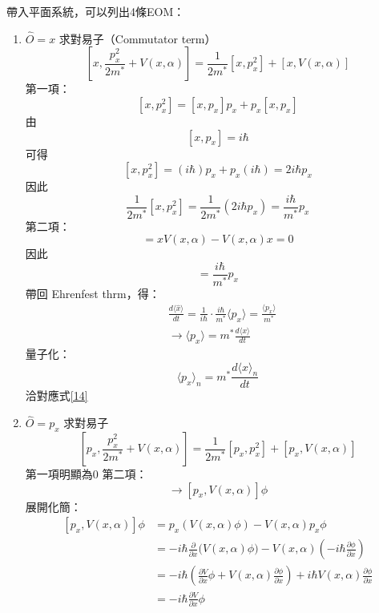 \documentclass[12pt]{article}
\begin{document}
帶入平面系統，可以列出4條EOM：
\begin{enumerate}
    \item $\hat{O}=x$
\newline\noindent
求對易子（Commutator term）
\begin{equation*}
    \left[x,\frac{p_x^2}{2m^*}+V(x,\alpha)\right]=\frac{1}{2m^*}\left[x,p_x^2\right]+\left[x,V(x,\alpha)\right]
\end{equation*}
第一項：
\begin{equation*}
    \left[x,p_x^2\right]= [x, p_x] p_x + p_x [x, p_x]
\end{equation*}
由\[[x,p_x]=i\hbar\]
可得
\begin{equation*}
    \left[ x, p_x^2 \right] = (i\hbar) p_x + p_x (i\hbar) = 2i\hbar p_x
\end{equation*}
因此
\begin{equation}
    \frac{1}{2m^*}\left[ x, p_x^2 \right] = \frac{1}{2m^*} (2i\hbar p_x) = \frac{i\hbar}{m^*}p_x
\end{equation}
第二項：
\begin{equation}
    [x, V(x, \alpha)] = x V(x, \alpha) - V(x, \alpha) x = 0
\end{equation}
因此
\begin{equation}
    [x,H]=\frac{i\hbar}{m^*}p_x
\end{equation}
帶回 Ehrenfest thrm，得：
\begin{align}
    &\frac{d\langle\hat{x}\rangle}{dt}=\frac{1}{i\hbar}\cdot\frac{i\hbar}{m^*}\langle p_x\rangle=\frac{\langle p_x\rangle}{m^*}\nonumber \\
    &\to \langle p_x\rangle=m^*\frac{d\langle x\rangle}{dt}
\end{align}
量子化：
\begin{equation}
    \langle p_x\rangle_n=m^*\frac{d\langle x\rangle_n}{dt}\label{39}
\end{equation}
洽對應式\eqref{14}
    \item $\hat{O}=p_x$
\newline\noindent
求對易子
\begin{equation*}
    \left[p_x,\frac{p_x^2}{2m^*}+V(x,\alpha)\right]=\frac{1}{2m^*}\left[p_x,p_x^2\right]+\left[p_x,V(x,\alpha)\right]
\end{equation*}
第一項明顯為0
\newline\noindent
第二項：
\begin{equation}
    [p_x,V(x,\alpha)]\to[p_x,V(x,\alpha)]\phi
\end{equation}
展開化簡：
\[\begin{aligned} [p_x, V(x,\alpha)] \phi &= p_x (V(x,\alpha) \phi) - V(x,\alpha) p_x\phi \\ &= -i\hbar \frac{\partial}{\partial x} \big( V(x,\alpha) \phi \big) - V(x,\alpha) \left( -i\hbar \frac{\partial\phi}{\partial x} \right) \\ &= -i\hbar \left( \frac{\partial V}{\partial x}\phi + V(x,\alpha)\frac{\partial\phi}{\partial x} \right) + i\hbar V(x,\alpha)\frac{\partial\phi}{\partial x} \\ &= -i\hbar \frac{\partial V}{\partial x} \phi \end{aligned}\]

\end{enumerate}
\end{document}
